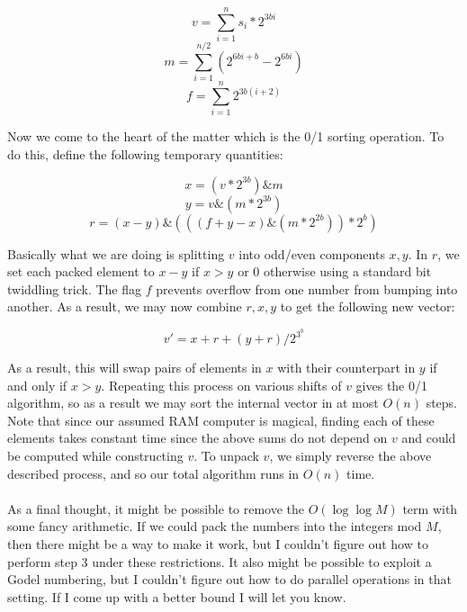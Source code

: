 \documentclass{article}
\begin{document}
\[ v = \sum_{i=1}^n s_i * 2^{3 b i} \]
\[ m = \sum_{i=1}^{n/2} (2^{6 b i + b} - 2^{6 b i}) \]
\[ f = \sum_{i=1}^n 2^{3 b (i + 2)} \]

Now we come to the heart of the matter which is the 0/1 sorting operation.  To do this, define the following temporary quantities:

\[ x = (v * 2^{3b}) \& m \]
\[ y = v \& (m * 2^{3 b}) \]
\[ r = (x - y) \& (((f + y - x) \& (m * 2^{2b})) * 2^{b}) \]

Basically what we are doing is splitting $v$ into odd/even components $x,y$.  In $r$, we set each packed element to $x-y$ if $x>y$ or $0$ otherwise using a standard bit twiddling trick.  The flag $f$ prevents overflow from one number from bumping into another.  As a result, we may now combine $r, x, y$ to get the following new vector:

\[ v' = x + r + (y + r) / 2^{3^b} \]

As a result, this will swap pairs of elements in $x$ with their counterpart in $y$ if and only if $x > y$.  Repeating this process on various shifts of $v$ gives the 0/1 algorithm, so as a result we may sort the internal vector in at most $O(n)$ steps.  Note that since our assumed RAM computer is magical, finding each of these elements takes constant time since the above sums do not depend on $v$ and could be computed while constructing $v$.  To unpack $v$, we simply reverse the above described process, and so our total algorithm runs in $O(n)$ time.

\paragraph{} As a final thought, it might be possible to remove the $O(\log{\log{M}})$ term with some fancy arithmetic.  If we could pack the numbers into the integers mod $M$, then there might be a way to make it work, but I couldn't figure out how to perform step 3 under these restrictions.  It also might be possible to exploit a Godel numbering, but I couldn't figure out how to do parallel operations in that setting.  If I come up with a better bound I will let you know.
\end{document}
